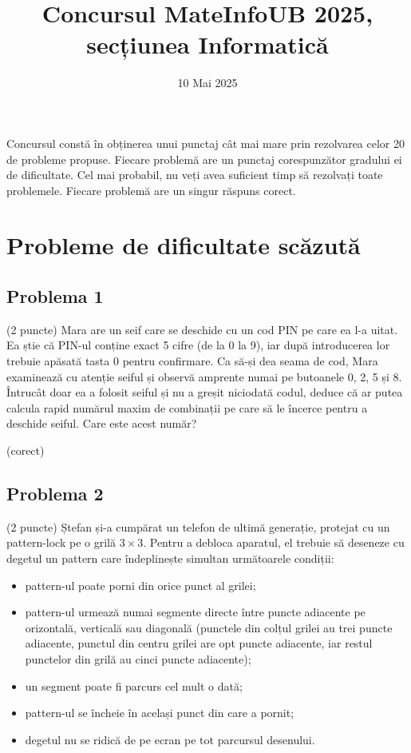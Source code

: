 \documentclass{exam}
\title{Concursul MateInfoUB 2025, secțiunea Informatică}
\date{10 Mai 2025}
\begin{document}
\maketitle

Concursul constă în obținerea unui punctaj cât mai mare prin rezolvarea celor 20 de probleme propuse. Fiecare problemă are un punctaj corespunzător gradului ei de dificultate. Cel mai probabil, nu veți avea suficient timp să rezolvați toate problemele. Fiecare problemă are un singur răspuns corect.

\section{Probleme de dificultate scăzută}



\subsection*{Problema 1}

(2 puncte) Mara are un seif care se deschide cu un cod PIN  pe care ea l-a uitat. Ea știe că PIN-ul conține exact 5 cifre (de la 0 la 9), iar după introducerea lor trebuie apăsată tasta 0 pentru confirmare. Ca să-și dea seama de cod, Mara examinează cu atenție seiful și observă amprente numai pe butoanele 0, 2, 5 și 8. Întrucât doar ea a folosit seiful și nu a greșit niciodată codul, deduce că ar putea calcula rapid numărul maxim de combinații pe care să le încerce pentru a deschide seiful. Care este acest număr? \\



\begin{oneparchoices}
  (corect)
\end{oneparchoices}
\subsection*{Problema 2}

(2 puncte) Ștefan și-a cumpărat un telefon de ultimă generație, protejat cu un pattern-lock pe o grilă $3 \times 3$. Pentru a debloca aparatul, el trebuie să deseneze cu degetul un pattern care îndeplinește simultan următoarele condiții:

\begin{itemize}
 \item pattern-ul poate porni din orice punct al grilei; 
 \item pattern-ul urmează numai segmente directe între puncte adiacente pe orizontală, verticală sau diagonală (punctele din colțul grilei au trei puncte adiacente, punctul din centru grilei are opt puncte adiacente, iar restul punctelor din grilă au cinci puncte adiacente);
 \item un segment poate fi parcurs cel mult o dată;
 \item pattern-ul se încheie în același punct din care a pornit;
 \item degetul nu se ridică de pe ecran pe tot parcursul desenului.
\end{itemize}
\end{document}
